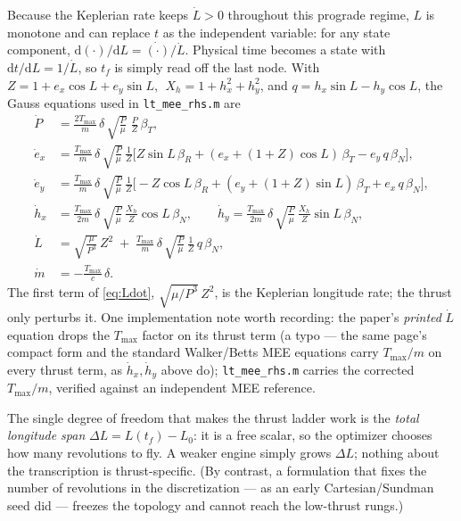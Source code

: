 \documentclass[11pt]{article}
\newcommand{\file}[1]{\texttt{\small #1}}
\newcommand{\Tmax}{T_{\max}}
\begin{document}
Because the Keplerian rate keeps $\dot L>0$ throughout this prograde regime, $L$
is monotone and can replace $t$ as the independent variable: for any state
component, $\mathrm{d}(\cdot)/\mathrm{d}L=\dot{(\cdot)}/\dot L$. Physical time
becomes a state with $\mathrm{d}t/\mathrm{d}L=1/\dot L$, so $t_f$ is simply read
off the last node. With
$Z=1+e_x\cos L+e_y\sin L$, $\;X_h=1+h_x^2+h_y^2$, and
$q=h_x\sin L-h_y\cos L$, the Gauss equations used in \file{lt\_mee\_rhs.m} are
\begin{align}
\dot P     &= \frac{2\Tmax}{m}\,\delta\,\sqrt{\tfrac{P}{\mu}}\;\frac{P}{Z}\,\beta_T,\\
\dot e_x   &= \frac{\Tmax}{m}\,\delta\,\sqrt{\tfrac{P}{\mu}}\,\frac1Z\Big[Z\sin L\,\beta_R+(e_x+(1+Z)\cos L)\,\beta_T-e_y\,q\,\beta_N\Big],\\
\dot e_y   &= \frac{\Tmax}{m}\,\delta\,\sqrt{\tfrac{P}{\mu}}\,\frac1Z\Big[-Z\cos L\,\beta_R+(e_y+(1+Z)\sin L)\,\beta_T+e_x\,q\,\beta_N\Big],\\
\dot h_x   &= \frac{\Tmax}{2m}\,\delta\,\sqrt{\tfrac{P}{\mu}}\,\frac{X_h}{Z}\cos L\,\beta_N,\qquad
\dot h_y   = \frac{\Tmax}{2m}\,\delta\,\sqrt{\tfrac{P}{\mu}}\,\frac{X_h}{Z}\sin L\,\beta_N,\\
\dot L     &= \sqrt{\tfrac{\mu}{P^3}}\,Z^2 \;+\; \frac{\Tmax}{m}\,\delta\,\sqrt{\tfrac{P}{\mu}}\,\frac1Z\,q\,\beta_N,
\label{eq:Ldot}\\
\dot m     &= -\frac{\Tmax}{c}\,\delta .
\end{align}
The first term of \eqref{eq:Ldot}, $\sqrt{\mu/P^3}\,Z^2$, is the Keplerian
longitude rate; the thrust only perturbs it. One implementation note worth
recording: the paper's \emph{printed} $\dot L$ equation drops the $\Tmax$ factor
on its thrust term (a typo --- the same page's compact form and the standard
Walker/Betts MEE equations \cite{walker1985,betts2010} carry $\Tmax/m$ on every
thrust term, as $\dot h_x,\dot h_y$ above do); \file{lt\_mee\_rhs.m} carries the
corrected $\Tmax/m$, verified against an independent MEE reference.

The single degree of freedom that makes the thrust ladder work is the
\emph{total longitude span} $\Delta L=L(t_f)-L_0$: it is a free scalar, so the
optimizer chooses how many revolutions to fly. A weaker engine simply grows
$\Delta L$; nothing about the transcription is thrust-specific. (By contrast, a
formulation that fixes the number of revolutions in the discretization --- as an
early Cartesian/Sundman seed did --- freezes the topology and cannot reach the
low-thrust rungs.)
\end{document}
